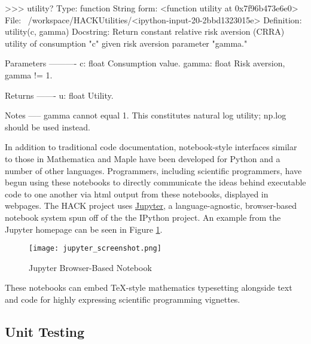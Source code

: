 \documentclass[]{article}
\newenvironment{Shaded}{}{}
\newcommand{\DataTypeTok}[1]{\textcolor[rgb]{0.56,0.13,0.00}{{#1}}}
\newcommand{\DecValTok}[1]{\textcolor[rgb]{0.25,0.63,0.44}{{#1}}}
\newcommand{\BaseNTok}[1]{\textcolor[rgb]{0.25,0.63,0.44}{{#1}}}
\newcommand{\StringTok}[1]{\textcolor[rgb]{0.25,0.44,0.63}{{#1}}}
\newcommand{\NormalTok}[1]{{#1}}
\begin{document}
\begin{Shaded}
\begin{Highlighting}[]
\NormalTok{>>> utility?}
\NormalTok{Type:        function}
\NormalTok{String form: <function utility at }\BaseNTok{0x7f96b473e6e0}\NormalTok{>}
\NormalTok{File:        ~/workspace/HACKUtilities/<ipython-}\DataTypeTok{input}\DecValTok{-20}\NormalTok{-2bbd1323015e>}
\NormalTok{Definition:  utility(c, gamma)}
\NormalTok{Docstring:}
\NormalTok{Return constant relative risk aversion (CRRA) utility of consumption }\StringTok{"c"}
\NormalTok{given risk aversion parameter }\StringTok{"gamma."}

\NormalTok{Parameters}
\NormalTok{----------}
\NormalTok{c: }\DataTypeTok{float}
    \NormalTok{Consumption value.}
\NormalTok{gamma: }\DataTypeTok{float}
    \NormalTok{Risk aversion, gamma != }\DecValTok{1}\NormalTok{.}

\NormalTok{Returns}
\NormalTok{-------}
\NormalTok{u: }\DataTypeTok{float}
    \NormalTok{Utility.}

\NormalTok{Notes}
\NormalTok{-----}
\NormalTok{gamma cannot equal }\DecValTok{1}\NormalTok{. This constitutes natural log utility; np.log}
\NormalTok{should be used instead.}
\end{Highlighting}
\end{Shaded}

In addition to traditional code documentation, notebook-style interfaces
similar to those in Mathematica and Maple have been developed for Python
and a number of other languages. Programmers, including scientific
programmers, have begun using these notebooks to directly communicate
the ideas behind executable code to one another via html output from
these notebooks, displayed in webpages. The HACK project uses
\href{https://jupyter.org/}{Jupyter}, a language-agnostic, browser-based
notebook system spun off of the the IPython project. An example from the
Jupyter homepage can be seen in Figure \ref{fig:jupyter_example_1}.

\begin{figure}[htbp]
\centering
\texttt{[image: jupyter\_screenshot.png]}
\caption{Jupyter Browser-Based Notebook\label{fig:jupyter_example_1}}
\end{figure}

These notebooks can embed TeX-style mathematics typesetting alongside
text and code for highly expressing scientific programming vignettes.

\subsection{Unit Testing}\label{unit-testing}
\end{document}
